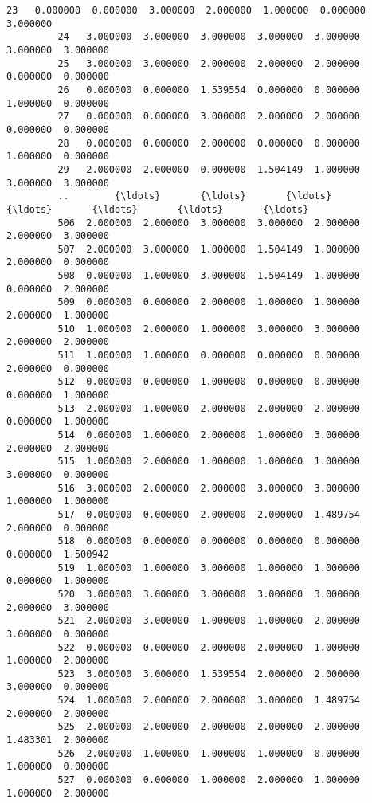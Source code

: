 \documentclass[11pt]{article}
\begin{document}
\begin{Verbatim}[commandchars=\\\{\}]
         23   0.000000  0.000000  3.000000  2.000000  1.000000  0.000000  3.000000   
         24   3.000000  3.000000  3.000000  3.000000  3.000000  3.000000  3.000000   
         25   3.000000  3.000000  2.000000  2.000000  2.000000  0.000000  0.000000   
         26   0.000000  0.000000  1.539554  0.000000  0.000000  1.000000  0.000000   
         27   0.000000  0.000000  3.000000  2.000000  2.000000  0.000000  0.000000   
         28   0.000000  0.000000  2.000000  0.000000  0.000000  1.000000  0.000000   
         29   2.000000  2.000000  0.000000  1.504149  1.000000  3.000000  3.000000   
         ..        {\ldots}       {\ldots}       {\ldots}       {\ldots}       {\ldots}       {\ldots}       {\ldots}   
         506  2.000000  2.000000  3.000000  3.000000  2.000000  2.000000  3.000000   
         507  2.000000  3.000000  1.000000  1.504149  1.000000  2.000000  0.000000   
         508  0.000000  1.000000  3.000000  1.504149  1.000000  0.000000  2.000000   
         509  0.000000  0.000000  2.000000  1.000000  1.000000  2.000000  1.000000   
         510  1.000000  2.000000  1.000000  3.000000  3.000000  2.000000  2.000000   
         511  1.000000  1.000000  0.000000  0.000000  0.000000  2.000000  0.000000   
         512  0.000000  0.000000  1.000000  0.000000  0.000000  0.000000  1.000000   
         513  2.000000  1.000000  2.000000  2.000000  2.000000  0.000000  1.000000   
         514  0.000000  1.000000  2.000000  1.000000  3.000000  2.000000  2.000000   
         515  1.000000  2.000000  1.000000  1.000000  1.000000  3.000000  0.000000   
         516  3.000000  2.000000  2.000000  3.000000  3.000000  1.000000  1.000000   
         517  0.000000  0.000000  2.000000  2.000000  1.489754  2.000000  0.000000   
         518  0.000000  0.000000  0.000000  0.000000  0.000000  0.000000  1.500942   
         519  1.000000  1.000000  3.000000  1.000000  1.000000  0.000000  1.000000   
         520  3.000000  3.000000  3.000000  3.000000  3.000000  2.000000  3.000000   
         521  2.000000  3.000000  1.000000  1.000000  2.000000  3.000000  0.000000   
         522  0.000000  0.000000  2.000000  2.000000  1.000000  1.000000  2.000000   
         523  3.000000  3.000000  1.539554  2.000000  2.000000  3.000000  0.000000   
         524  1.000000  2.000000  2.000000  3.000000  1.489754  2.000000  2.000000   
         525  2.000000  2.000000  2.000000  2.000000  2.000000  1.483301  2.000000   
         526  2.000000  1.000000  1.000000  1.000000  0.000000  1.000000  0.000000   
         527  0.000000  0.000000  1.000000  2.000000  1.000000  1.000000  2.000000   

\end{Verbatim}
\end{document}
